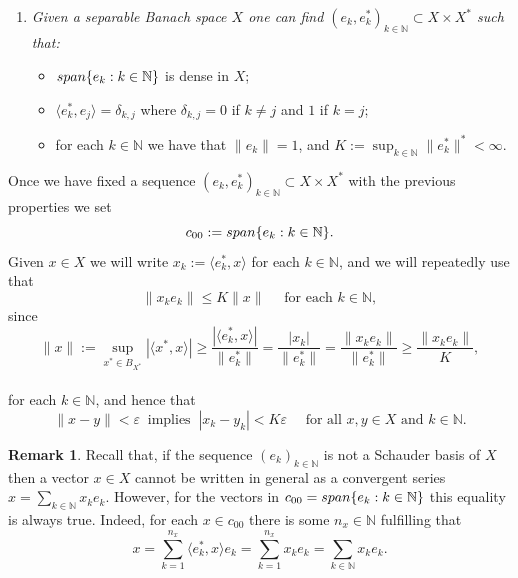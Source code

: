 \documentclass[openright,11pt]{article}
\theoremstyle{plain}
\theoremstyle{definition}
\newtheorem{remark}[theorem]{Remark}
\newcommand{\NN}{\mathbb{N}}
\newcommand{\lspan}{\textup{span}}
\newcommand{\eps}{\varepsilon}
\newcommand{\ep}[2]{\langle #1 , #2 \rangle}
\begin{document}
\begin{enumerate}[--]
	\item {\em Given a separable Banach space $X$ one can find $(e_k,e_k^*)_{k\in\NN} \subset X\times X^*$ such that:
		\begin{itemize}
			\item $\lspan\{ e_k : k \in \NN \}$ is dense in $X$;
			
			\item $\ep{e_k^*}{e_j} = \delta_{k,j}$ where $\delta_{k,j}=0$ if $k\neq j$ and $1$ if $k=j$;
			
			\item for each $k \in \NN$ we have that $\|e_k\| = 1$, and $K := \sup_{k\in\NN} \|e_k^*\|^* < \infty$.
		\end{itemize}}
\end{enumerate}

Once we have fixed a sequence $(e_k,e_k^*)_{k\in\NN} \subset X\times X^*$ with the previous properties we set
\[
c_{00} := \lspan\{ e_k : k \in \NN \}.
\]
Given $x \in X$ we will write $x_k := \ep{e_k^*}{x}$ for each $k\in\NN$, and we will repeatedly use that
\begin{equation}\label{eq:1K.norma.x}
	\|x_k e_k\| \leq K \|x\| \quad \text{ for each } k \in \NN,
\end{equation}
since
\[
\|x\| := \sup_{x^* \in B_{X^*}} |\ep{x^*}{x}| \geq \frac{|\ep{e_k^*}{x}|}{\|e_k^*\|} = \frac{|x_k|}{\|e_k^*\|} = \frac{\|x_k e_k\|}{\|e_k^*\|} \geq \frac{\|x_k e_k\|}{K},
\]\\
for each $k \in \NN$, and hence that
\begin{equation}\label{eq:2K.eps}
	\|x-y\|<\eps \ \text{ implies } \ |x_k-y_k|<K\eps \quad \text{ for all } x,y \in X \text{ and } k \in \NN.
\end{equation}

\begin{remark}
	Recall that, if the sequence $(e_k)_{k\in\NN}$ is not a Schauder basis of $X$ then a vector $x \in X$ cannot be written  in general as a convergent series $x = \sum_{k\in\NN} x_k e_k$. However, for the vectors in $c_{00} = \lspan\{ e_k : k \in \NN \}$ this equality is always true. Indeed, for each $x \in c_{00}$ there is some $n_x\in\NN$ fulfilling that
	\[
	x = \sum_{k=1}^{n_x} \ep{e_k^*}{x} e_k = \sum_{k=1}^{n_x} x_k e_k = \sum_{k\in\NN} x_k e_k.
	\]\\[-8pt]
\end{remark}
\end{document}
